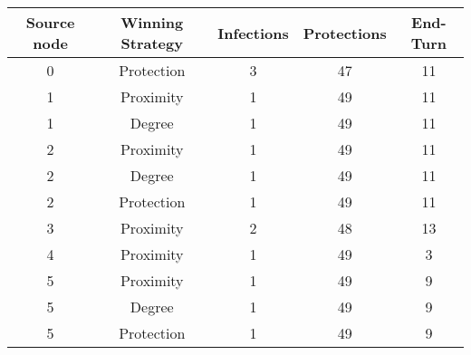 \documentclass[results.tex]{subfiles}
\begin{document}
    \begin{center}
        \begin{tabular}{| c || c | c | c | c |}
            \hline
            {\bfseries Source node} & {\bfseries Winning Strategy} & {\bfseries Infections} & {\bfseries Protections}
            & {\bfseries End-Turn}
            \\  %
            \hline\hline
            0                       & Protection                   & 3                      & 47                      & 11                   \\
            \hline
            1                       & Proximity                    & 1                      & 49                      & 11                   \\
            \hline
            1                       & Degree                       & 1                      & 49                      & 11                   \\
            \hline
            2                       & Proximity                    & 1                      & 49                      & 11                   \\
            \hline
            2                       & Degree                       & 1                      & 49                      & 11                   \\
            \hline
            2                       & Protection                   & 1                      & 49                      & 11                   \\
            \hline
            3                       & Proximity                    & 2                      & 48                      & 13                   \\
            \hline
            4                       & Proximity                    & 1                      & 49                      & 3                    \\
            \hline
            5                       & Proximity                    & 1                      & 49                      & 9                    \\
            \hline
            5                       & Degree                       & 1                      & 49                      & 9                    \\
            \hline
            5                       & Protection                   & 1                      & 49                      & 9                    \\

\end{tabular}
\end{center}
\end{document}
